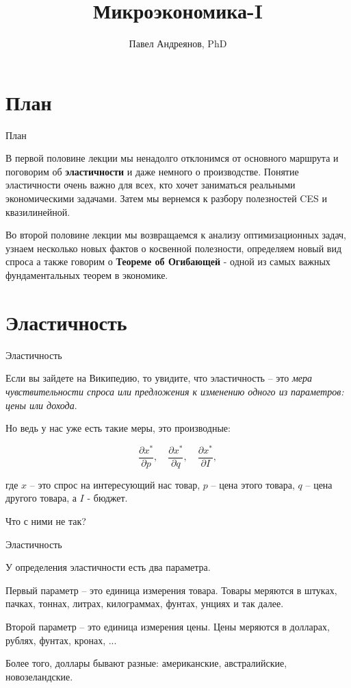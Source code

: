 \documentclass{beamer}
\title{
Микроэкономика-I
}
\author{
Павел Андреянов, PhD
}
\begin{document}
\maketitle

\section{План}

\begin{frame}{План}

В первой половине лекции мы ненадолго отклонимся от основного маршрута и поговорим об \textbf{эластичности} и даже немного о производстве. Понятие эластичности очень важно для всех, кто хочет заниматься реальными экономическими задачами. Затем мы вернемся к разбору полезностей CES и квазилинейной.

Во второй половине лекции мы возвращаемся к анализу оптимизационных задач, узнаем несколько новых фактов о косвенной полезности, определяем новый вид спроса а также говорим о \textbf{Теореме об Огибающей} - одной из самых важных фундаментальных теорем в экономике.

\end{frame}


\section{Эластичность}

\begin{frame}{Эластичность}

Если вы зайдете на Википедию, то увидите, что эластичность – это \textit{мера чувствительности спроса или предложения к изменению одного из параметров: цены или дохода}. 

Но ведь у нас уже есть такие меры, это производные:

$$\frac{\partial x^{\ast}}{\partial p}, \quad \frac{\partial x^{\ast}}{\partial q}, \quad \frac{\partial x^{\ast}}{\partial I},$$

где $x$ – это спрос на интересующий нас товар, $p$ – цена этого товара, $q$ – цена другого товара, а $I$ - бюджет. 

Что с ними не так?

\end{frame}

\begin{frame}{Эластичность}

У определения эластичности есть два параметра. 

Первый параметр – это единица измерения товара. Товары меряются в штуках, пачках, тоннах, литрах, килограммах, фунтах, унциях и так далее. 

Второй параметр – это единица измерения цены. Цены меряются в долларах, рублях, фунтах, кронах, ... 

Более того, доллары бывают разные: американские, австралийские, новозеландские. 

\end{frame}
\end{document}
